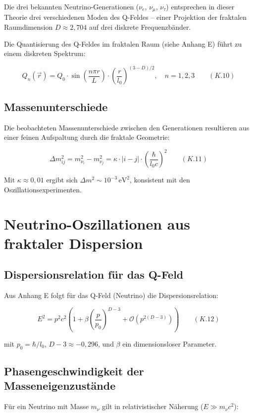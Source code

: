 Die drei bekannten Neutrino-Generationen ($\nu_e$, $\nu_\mu$, $\nu_\tau$) entsprechen 
in dieser Theorie drei verschiedenen Moden des Q-Feldes – einer Projektion der 
fraktalen Raumdimension $D \approx 2,704$ auf drei diskrete Frequenzbänder.

Die Quantisierung des Q-Feldes im fraktalen Raum (siehe Anhang E) führt zu einem 
diskreten Spektrum:

\[
Q_n(\vec{r}) = Q_0 \cdot \sin\left(\frac{n\pi r}{L}\right) \cdot \left(\frac{r}{l_0}\right)^{(3-D)/2}, \quad n = 1, 2, 3 \qquad (K.10)
\]

\subsection{Massenunterschiede}

Die beobachteten Massenunterschiede zwischen den Generationen resultieren aus einer 
feinen Aufspaltung durch die fraktale Geometrie:

\[
\Delta m_{ij}^2 = m_{\nu_i}^2 - m_{\nu_j}^2 = \kappa \cdot |i-j| \cdot \left(\frac{\hbar}{l_0 c}\right)^2 \qquad (K.11)
\]

Mit $\kappa \approx 0,01$ ergibt sich $\Delta m^2 \sim 10^{-3}\,\text{eV}^2$, konsistent 
mit den Oszillationsexperimenten.

\section{Neutrino-Oszillationen aus fraktaler Dispersion}

\subsection{Dispersionsrelation für das Q-Feld}

Aus Anhang E folgt für das Q-Feld (Neutrino) die Dispersionsrelation:

\[
E^2 = p^2 c^2 \left(1 + \beta \left(\frac{p}{p_0}\right)^{D-3} + \mathcal{O}(p^{2(D-3)})\right) \qquad (K.12)
\]

mit $p_0 = \hbar/l_0$, $D-3 \approx -0,296$, und $\beta$ ein dimensionsloser Parameter.

\subsection{Phasengeschwindigkeit der Masseneigenzustände}

Für ein Neutrino mit Masse $m_{\nu}$ gilt in relativistischer Näherung ($E \gg m_{\nu}c^2$):

